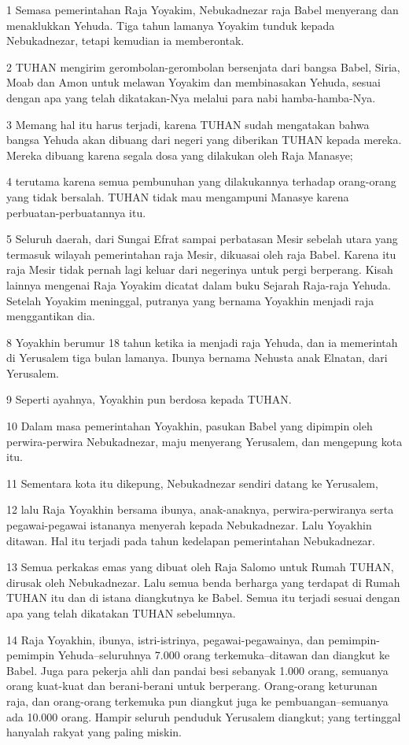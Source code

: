 \par 1 Semasa pemerintahan Raja Yoyakim, Nebukadnezar raja Babel menyerang dan menaklukkan Yehuda. Tiga tahun lamanya Yoyakim tunduk kepada Nebukadnezar, tetapi kemudian ia memberontak.
\par 2 TUHAN mengirim gerombolan-gerombolan bersenjata dari bangsa Babel, Siria, Moab dan Amon untuk melawan Yoyakim dan membinasakan Yehuda, sesuai dengan apa yang telah dikatakan-Nya melalui para nabi hamba-hamba-Nya.
\par 3 Memang hal itu harus terjadi, karena TUHAN sudah mengatakan bahwa bangsa Yehuda akan dibuang dari negeri yang diberikan TUHAN kepada mereka. Mereka dibuang karena segala dosa yang dilakukan oleh Raja Manasye;
\par 4 terutama karena semua pembunuhan yang dilakukannya terhadap orang-orang yang tidak bersalah. TUHAN tidak mau mengampuni Manasye karena perbuatan-perbuatannya itu.
\par 5 Seluruh daerah, dari Sungai Efrat sampai perbatasan Mesir sebelah utara yang termasuk wilayah pemerintahan raja Mesir, dikuasai oleh raja Babel. Karena itu raja Mesir tidak pernah lagi keluar dari negerinya untuk pergi berperang. Kisah lainnya mengenai Raja Yoyakim dicatat dalam buku Sejarah Raja-raja Yehuda. Setelah Yoyakim meninggal, putranya yang bernama Yoyakhin menjadi raja menggantikan dia.
\par 8 Yoyakhin berumur 18 tahun ketika ia menjadi raja Yehuda, dan ia memerintah di Yerusalem tiga bulan lamanya. Ibunya bernama Nehusta anak Elnatan, dari Yerusalem.
\par 9 Seperti ayahnya, Yoyakhin pun berdosa kepada TUHAN.
\par 10 Dalam masa pemerintahan Yoyakhin, pasukan Babel yang dipimpin oleh perwira-perwira Nebukadnezar, maju menyerang Yerusalem, dan mengepung kota itu.
\par 11 Sementara kota itu dikepung, Nebukadnezar sendiri datang ke Yerusalem,
\par 12 lalu Raja Yoyakhin bersama ibunya, anak-anaknya, perwira-perwiranya serta pegawai-pegawai istananya menyerah kepada Nebukadnezar. Lalu Yoyakhin ditawan. Hal itu terjadi pada tahun kedelapan pemerintahan Nebukadnezar.
\par 13 Semua perkakas emas yang dibuat oleh Raja Salomo untuk Rumah TUHAN, dirusak oleh Nebukadnezar. Lalu semua benda berharga yang terdapat di Rumah TUHAN itu dan di istana diangkutnya ke Babel. Semua itu terjadi sesuai dengan apa yang telah dikatakan TUHAN sebelumnya.
\par 14 Raja Yoyakhin, ibunya, istri-istrinya, pegawai-pegawainya, dan pemimpin-pemimpin Yehuda--seluruhnya 7.000 orang terkemuka--ditawan dan diangkut ke Babel. Juga para pekerja ahli dan pandai besi sebanyak 1.000 orang, semuanya orang kuat-kuat dan berani-berani untuk berperang. Orang-orang keturunan raja, dan orang-orang terkemuka pun diangkut juga ke pembuangan--semuanya ada 10.000 orang. Hampir seluruh penduduk Yerusalem diangkut; yang tertinggal hanyalah rakyat yang paling miskin.
